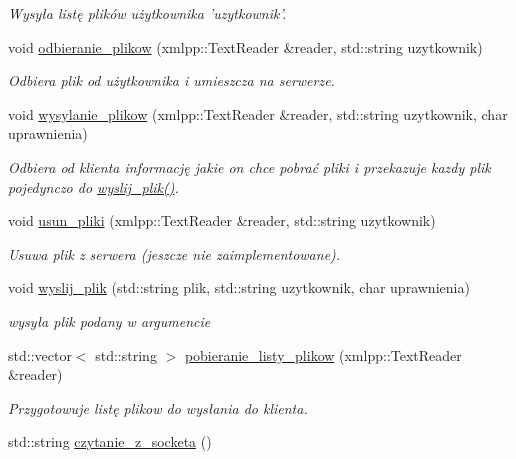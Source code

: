 \begin{CompactItemize}
\begin{CompactList}\small\item\em Wysyła listę plików użytkownika 'uzytkownik'. \item\end{CompactList}\item 
void \hyperlink{a00005_4e084ae10e8498b171c44a0138597d2e}{odbieranie\_\-plikow} (xmlpp::TextReader \&reader, std::string uzytkownik)
\begin{CompactList}\small\item\em Odbiera plik od użytkownika i umieszcza na serwerze. \item\end{CompactList}\item 
void \hyperlink{a00005_0315a358465b40be344fddc7926c1316}{wysylanie\_\-plikow} (xmlpp::TextReader \&reader, std::string uzytkownik, char uprawnienia)
\begin{CompactList}\small\item\em Odbiera od klienta informację jakie on chce pobrać pliki i przekazuje kazdy plik pojedynczo do \hyperlink{a00005_e726284253cddec4b4b547a9d0254380}{wyslij\_\-plik()}. \item\end{CompactList}\item 
void \hyperlink{a00005_7ef79f818429f70b9cb35c0a33b59a10}{usun\_\-pliki} (xmlpp::TextReader \&reader, std::string uzytkownik)
\begin{CompactList}\small\item\em Usuwa plik z serwera (jeszcze nie zaimplementowane). \item\end{CompactList}\item 
void \hyperlink{a00005_e726284253cddec4b4b547a9d0254380}{wyslij\_\-plik} (std::string plik, std::string uzytkownik, char uprawnienia)
\begin{CompactList}\small\item\em wysyła plik podany w argumencie \item\end{CompactList}\item 
std::vector$<$ std::string $>$ \hyperlink{a00005_05500b74ebdcc1578ead4c31fca73a5b}{pobieranie\_\-listy\_\-plikow} (xmlpp::TextReader \&reader)
\begin{CompactList}\small\item\em Przygotowuje listę plikow do wysłania do klienta. \item\end{CompactList}\item 
std::string \hyperlink{a00005_272ecc740702b4f48efdb8469b414b24}{czytanie\_\-z\_\-socketa} ()
\end{CompactItemize}
